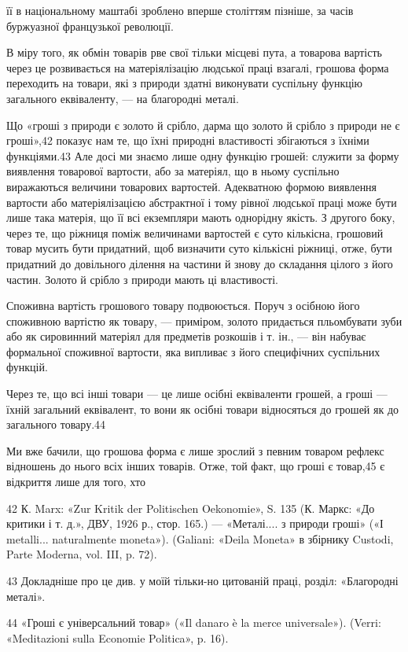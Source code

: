 її в національному маштабі зроблено вперше століттям пізніше,
за часів буржуазної французької революції.

В міру того, як обмін товарів рве свої тільки місцеві пута,
а товарова вартість через це розвивається на матеріялізацію
людської праці взагалі, грошова форма переходить на товари,
які з природи здатні виконувати суспільну функцію загального
еквіваленту, — на благородні металі.

Що «гроші з природи є золото й срібло, дарма що золото й
срібло з природи не є гроші»,42 показує нам те, що їхні природні
властивості збігаються з їхніми функціями.43 Але досі
ми знаємо лише одну функцію грошей: служити за форму виявлення
товарової вартости, або за матеріял, що в ньому суспільно
виражаються величини товарових вартостей. Адекватною формою
виявлення вартости або матеріялізацією абстрактної і тому рівної
людської праці може бути лише така матерія, що її всі екземпляри
мають однорідну якість. З другого боку, через те, що ріжниця
поміж величинами вартостей є суто кількісна, грошовий товар
мусить бути придатний, щоб визначити суто кількісні ріжниці,
отже, бути придатний до довільного ділення на частини й знову
до складання цілого з його частин. Золото й срібло з природи
мають ці властивості.

Споживна вартість грошового товару подвоюється. Поруч з
осібною його споживною вартістю як товару, — приміром, золото
придається пльомбувати зуби або як сировинний матеріял
для предметів розкошів і т. ін., — він набуває формальної споживної
вартости, яка випливає з його специфічних суспільних
функцій.

Через те, що всі інші товари — це лише осібні еквіваленти
грошей, а гроші — їхній загальний еквівалент, то вони як осібні
товари відносяться до грошей як до загального товару.44

Ми вже бачили, що грошова форма є лише зрослий з певним
товаром рефлекс відношень до нього всіх інших товарів. Отже,
той факт, що гроші є товар,45 є відкриття лише для того, хто

42 К. Marx: «Zur Kritik der Politischen Oekonomie», S. 135 (К. Маркс:
«До критики і т. д.», ДВУ, 1926 р., стор. 165.) — «Металі.... з природи
гроші» («І metalli... naturalmente moneta»). (Galiani: «Deila Moneta»
в збірнику Custodi, Parte Moderna, vol. III, p. 72).

43 Докладніше про це див. у моїй тільки-но цитованій праці, розділ:
«Благородні металі».

44 «Гроші є універсальний товар» («Il danaro è la merce universale»).
(Verri: «Meditazioni sulla Economie Politica», p. 16).

